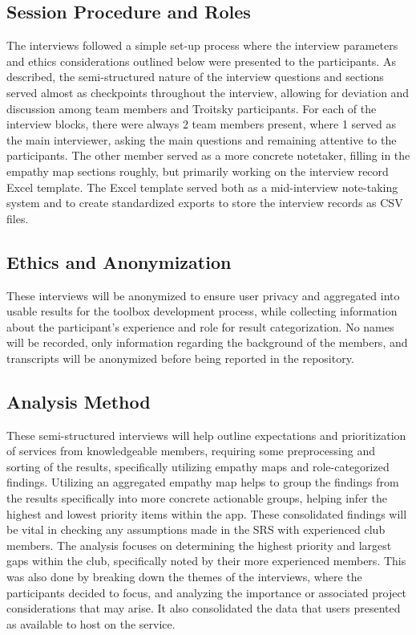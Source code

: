 \documentclass{article}
\begin{document}
\subsection{Session Procedure and Roles}

The interviews followed a simple set-up process where the interview parameters and ethics considerations outlined 
below were presented to the participants. As described, the semi-structured nature of the interview questions and sections 
served almost as checkpoints throughout the interview, allowing for deviation and discussion among team members and 
Troitsky participants. For each of the interview blocks, there were always 2 team members present, where 1 served as the 
main interviewer, asking the main questions and remaining attentive to the participants. The other member served as a 
more concrete notetaker, filling in the empathy map sections roughly, but primarily working on the interview record Excel template. 
The Excel template served both as a mid-interview note-taking system and to create standardized exports to store the 
interview records as CSV files.

\subsection{Ethics and Anonymization}

These interviews will be anonymized to ensure user privacy and aggregated into usable results for the 
toolbox development process, while collecting information about the participant's experience and role 
for result categorization. No names will be recorded, only information regarding the background of 
the members, and transcripts will be anonymized before being reported in the repository.

\subsection{Analysis Method}

These semi-structured interviews will help outline expectations and prioritization of services from 
knowledgeable members, requiring some preprocessing and sorting of the results, specifically 
utilizing empathy maps and role-categorized findings. Utilizing an aggregated empathy map helps to group the 
findings from the results specifically into more concrete actionable groups, helping infer the highest and 
lowest priority items within the app. These consolidated findings will be vital in checking any assumptions 
made in the SRS with experienced club members. The analysis focuses on determining the highest priority and 
largest gaps within the club, specifically noted by their more experienced members. This was also done by breaking 
down the themes of the interviews, where the participants decided to focus, and analyzing the importance 
or associated project considerations that may arise. It also consolidated the data that users presented 
as available to host on the service.
\end{document}
